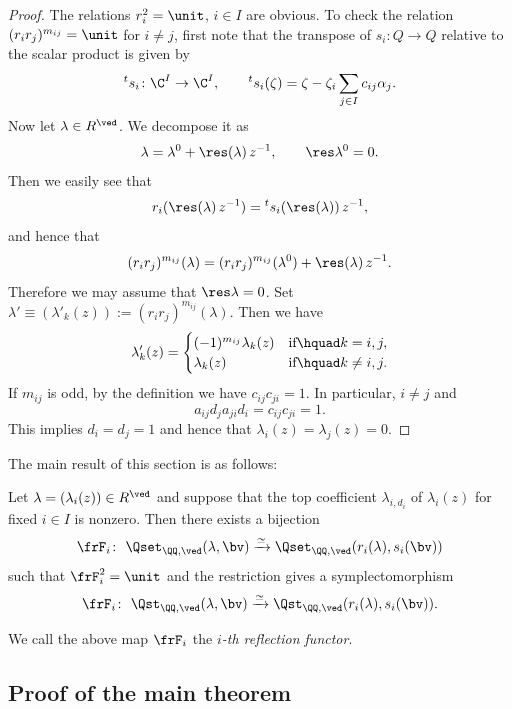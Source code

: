 \begin{proof}
The relations $r_i^2 = \unit$, $i \in I$ are obvious.
To check the relation $(r_ir_j)^{m_{ij}}=\unit$ for $i\neq j$,
f\/irst note that the transpose of $s_i \colon Q \to Q$
relative to the scalar product is given by
\[
{}^t s_i \colon \C^I \to \C^I, \qquad
{}^t s_i (\zeta) = \zeta - \zeta_i\sum_{j \in I} c_{ij} \alpha_j.
\]
Now let $\lambda \in R^\ved$. We decompose it as
\[
\lambda = \lambda^0 + \res (\lambda)\,z^{-1},
\qquad \res \lambda^0 =0.
\]
Then we easily see that
\[
r_i(\res(\lambda)\,z^{-1})={}^t s_i (\res(\lambda))\,z^{-1},
\]
and hence that
\[
(r_ir_j)^{m_{ij}} (\lambda) = (r_ir_j)^{m_{ij}} (\lambda^0)
+ \res (\lambda)\,z^{-1}.
\]
Therefore we may assume that $\res \lambda =0$.
Set $\lambda' \equiv (\lambda'_k(z)) := (r_ir_j)^{m_{ij}}(\lambda)$.
Then we have
\[
\lambda'_k(z) =
\begin{cases}
(-1)^{m_{ij}} \lambda_k(z) & \text{if}\hquad k=i,j, \\
\lambda_k(z) & \text{if}\hquad k \neq i,j.
\end{cases}
\]
If $m_{ij}$ is odd, by the def\/inition we have
$c_{ij}c_{ji}=1$.
In particular, $i \neq j$ and
\[
a_{ij} d_j a_{ji} d_i = c_{ij} c_{ji} =1.
\]
This implies $d_i=d_j=1$ and hence that
$\lambda_i(z) = \lambda_j(z)=0$.
\end{proof}

The main result of this section is as follows:
\begin{Theorem}\label{thm:ref}
Let $\lambda=(\lambda_i(z)) \in R^\ved$ and suppose that
the top coefficient $\lambda_{i,d_i}$ of $\lambda_i(z)$
for fixed $i \in I$ is nonzero.
Then there exists a bijection
\[
\frF_i \colon \ \Qset_{\QQ,\ved}(\lambda,\bv) \xrightarrow{\simeq}
\Qset_{\QQ,\ved}(r_i(\lambda),s_i(\bv))
\]
such that $\frF_i^2 = \unit$
and the restriction gives a symplectomorphism
\[
\frF_i \colon \ \Qst_{\QQ,\ved}(\lambda,\bv) \xrightarrow{\simeq}
\Qst_{\QQ,\ved}(r_i(\lambda),s_i(\bv)).
\]
\end{Theorem}

We call the above map $\frF_i$
the {\em $i$-th reflection functor}.

\subsection{Proof of the main theorem}\label{subsec:proof}

